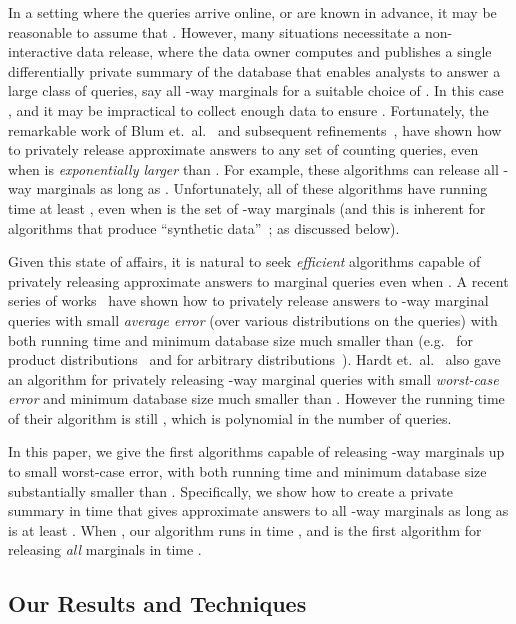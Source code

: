 \documentclass[11pt]{article}
\theoremstyle{definition}
\begin{document}
In a setting where the queries arrive online, or are known in advance, it may be reasonable to assume that .  However, many situations necessitate a non-interactive data release, where the data owner computes and publishes a single differentially private summary of the database that enables analysts to answer a large class of queries, say all -way marginals for a suitable choice of .  In this case , and it may be impractical to collect enough data to ensure .  Fortunately, the remarkable work of Blum et.~al.~\cite{BlumLiRo08} and subsequent refinements~\cite{DworkNaReRoVa09,DworkRoVa10,RothRo10,HardtRo10,HardtLiMc10,GuptaRoUl12}, have shown how to privately release approximate answers to any set of counting queries, even when  is \emph{exponentially larger} than .  For example, these algorithms can release all -way marginals as long as .  Unfortunately, all of these algorithms have running time at least , even when  is the set of -way marginals (and this is inherent for algorithms that produce ``synthetic data''~\cite{UllmanVa11}; as discussed below).

Given this state of affairs, it is natural to seek \emph{efficient} algorithms capable of privately releasing approximate answers to marginal queries even when .  A recent series of works~\cite{GuptaHaRoUl11,CheraghchiKlKoLe12,HardtRoSe12} have shown how to privately release answers to -way marginal queries with small \emph{average error} (over various distributions on the queries) with both running time and minimum database size much smaller than  (e.g.~ for product distributions~\cite{GuptaHaRoUl11,CheraghchiKlKoLe12} and  for arbitrary distributions~\cite{HardtRoSe12}).  Hardt et.~al.~\cite{HardtRoSe12} also gave an algorithm for privately releasing -way marginal queries with small \emph{worst-case error} and minimum database size much smaller than . However the running time of their algorithm is still , which is polynomial in the number of queries.

In this paper, we give the first algorithms capable of releasing -way marginals up to small worst-case error, with both running time and minimum database size substantially smaller than .  Specifically, we show how to create a private summary in time  that gives approximate answers to all -way marginals as long as  is at least .  When , our algorithm runs in time , and is the first algorithm for releasing \emph{all} marginals in time .

\subsection{Our Results and Techniques}
\end{document}
